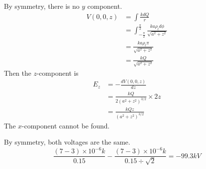 \documentclass[answers]{exam}
\begin{document}
\begin{questions}
\begin{solution}
	By symmetry, there is no $y$ component.
	\begin{align*}
		V(0,0,z) &= \int \frac{kdQ}{r} \\
			 &= \int_{-\frac{\pi}{2}}^\frac{\pi}{2} \frac{ka\rho_ld\phi}{\sqrt{a^2+z^2}} \\
			 &= \frac{ka\rho_l\pi}{\sqrt{a^2+z^2}} \\
			 &= \frac{kQ}{\sqrt{a^2+z^2}}
	\end{align*}
	Then the $z$-component is
	\begin{align*}
		E_z &= -\frac{dV(0,0,z)}{dz} \\
		    &= \frac{kQ}{2(a^2+z^2)^{3/2}} \times 2z \\
		    &= \frac{kQz}{(a^2+z^2)^{3/2}}
	\end{align*}
	The $x$-component cannot be found.
\end{solution}


\begin{solution}
	By symmetry, both voltages are the same.
	$$\frac{(7-3)\times10^{-6}k}{0.15} - \frac{(7-3)\times10^{-6}k}{0.15\div\sqrt{2}} = -99.3\unit{kV}$$
\end{solution}


\end{questions}
\end{document}
